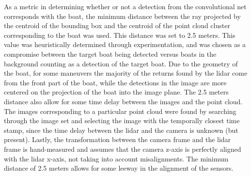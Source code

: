 As a metric in determining whether or not a detection from the convolutional net corresponds with the boat, the minimum distance between the ray projected by the centroid of the bounding box and the centroid of the point cloud cluster corresponding to the boat was used. This distance was set to 2.5 meters. This value was heuristically determined through experimentation, and was chosen as a compromise between the target boat being detected versus boats in the background counting as a detection of the target boat. Due to the geometry of the boat, for some maneuvers the majority of the returns found by the lidar come from the front part of the boat, while the detections in the image are more centered on the projection of the boat into the image plane. The 2.5 meters distance also allow for some time delay between the images and the point cloud. The images corresponding to a particular point cloud were found by searching through the image set and selecting the image with the temporally closest time stamp, since the time delay between the lidar and the camera is unknown (but present). Lastly, the transformation between the camera frame and the lidar frame is hand-measured and assumes that the camera z-axis is perfectly aligned with the lidar x-axis, not taking into account misalignments. The minimum distance of 2.5 meters allows for some leeway in the alignment of the sensors.

